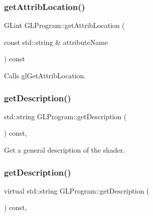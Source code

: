 \subsubsection{\texorpdfstring{get\+Attrib\+Location()}{getAttribLocation()}\hspace{0.1cm}{\footnotesize\ttfamily [2/2]}}
{\footnotesize\ttfamily G\+Lint G\+L\+Program\+::get\+Attrib\+Location (\begin{DoxyParamCaption}\item[{const std\+::string \&}]{attribute\+Name }\end{DoxyParamCaption}) const}

Calls gl\+Get\+Attrib\+Location. \mbox{\label{classGLProgram_a9766af5ab20c17bb747ea0da2f748acc}} 
\subsubsection{\texorpdfstring{get\+Description()}{getDescription()}\hspace{0.1cm}{\footnotesize\ttfamily [1/2]}}
{\footnotesize\ttfamily std\+::string G\+L\+Program\+::get\+Description (\begin{DoxyParamCaption}{ }\end{DoxyParamCaption}) const\hspace{0.3cm}{\ttfamily [protected]}, {\ttfamily [virtual]}}

Get a general description of the shader. \mbox{\label{classGLProgram_a1a061f789568dede0d1bfff0c8a9dfb7}} 
\subsubsection{\texorpdfstring{get\+Description()}{getDescription()}\hspace{0.1cm}{\footnotesize\ttfamily [2/2]}}
{\footnotesize\ttfamily virtual std\+::string G\+L\+Program\+::get\+Description (\begin{DoxyParamCaption}{ }\end{DoxyParamCaption}) const\hspace{0.3cm}{\ttfamily [protected]}, {\ttfamily [virtual]}}

